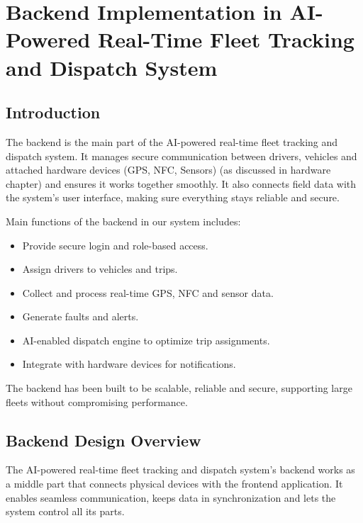

\maketitle

\chapter{Backend Implementation in AI-Powered Real-Time Fleet Tracking and Dispatch System}

\section{Introduction}
The backend is the main part of the AI-powered real-time fleet tracking and dispatch system. It manages secure communication between drivers, vehicles and attached hardware devices (GPS, NFC, Sensors) (as discussed in hardware chapter) and ensures it works together smoothly. It also connects field data with the system's user interface, making sure everything stays reliable and secure.

Main functions of the backend in our system includes:
\begin{itemize}
    \item Provide secure login and role-based access.
    \item Assign drivers to vehicles and trips.
    \item Collect and process real-time GPS, NFC and sensor data.
    \item Generate faults and alerts.
    \item AI-enabled dispatch engine to optimize trip assignments.
    \item Integrate with hardware devices for notifications.
\end{itemize}

The backend has been built to be scalable, reliable and secure, supporting large fleets without compromising performance.

\section{Backend Design Overview}
The AI-powered real-time fleet tracking and dispatch system's backend works as a middle part that connects physical devices with the frontend application. It enables seamless communication, keeps data in synchronization and lets the system control all its parts.

